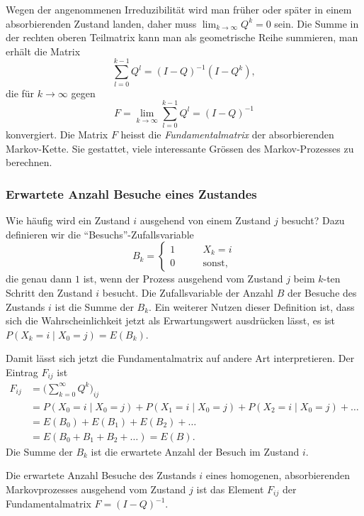 Wegen der angenommenen Irreduzibilität wird man
früher oder später in einem absorbierenden Zustand landen,
daher muss $\lim_{k\to\infty} Q^k=0$ sein.
Die Summe in der rechten oberen Teilmatrix kann man als geometrische
Reihe summieren, man erhält die Matrix
\[
\sum_{l=0}^{k-1} Q^l = (I-Q)^{-1}(I-Q^k),
\]
die für $k\to\infty$ gegen
\[
F
=
\lim_{k\to\infty} \sum_{l=0}^{k-1} Q^l
=
(I-Q)^{-1}
\]
konvergiert.
Die Matrix $F$ heisst die {\em Fundamentalmatrix} der absorbierenden
Markov-Kette.
%
Sie gestattet, viele interessante Grössen des Markov-Prozesses zu
berechnen.

\subsubsection{Erwartete Anzahl Besuche eines Zustandes}
Wie häufig wird ein Zustand $i$ ausgehend von einem Zustand $j$
besucht?
%
Dazu definieren wir die ``Besuchs''-Zufallsvariable
\[
B_{k}=\begin{cases}
1&\qquad\text{$X_k=i$}\\
0&\qquad\text{sonst,}
\end{cases}
\]
die genau dann $1$ ist, wenn der Prozess ausgehend vom Zustand $j$
beim $k$-ten Schritt den Zustand $i$ besucht.
Die Zufallsvariable der Anzahl $B$ der Besuche des Zustands $i$ ist die
Summe der $B_k$.
Ein weiterer Nutzen dieser Definition ist, dass sich die Wahrscheinlichkeit
jetzt als Erwartungswert ausdrücken lässt, es ist
$P(X_k=i \mid X_0=j) = E(B_k)$.

Damit lässt sich jetzt die Fundamentalmatrix auf andere Art interpretieren.
Der Eintrag $F_{i\!j}$ ist
\begin{align*}
F_{i\!j}
&=
\biggl(\sum_{k=0}^\infty Q^k\biggr)_{i\!j}
\\
&=
P(X_0=i\mid X_0=j)
+
P(X_1=i\mid X_0=j)
+
P(X_2=i\mid X_0=j)
+\dots
\\
&=E(B_0) + E(B_1) + E(B_2) + \dots
\\
&=E(B_0+B_1+B_2+\dots)
=E(B).
\end{align*}
Die Summe der $B_k$ ist die erwartete Anzahl der Besuch im Zustand $i$.

\begin{satz}
\label{buch:markov:satz:anzahlbesuche}
Die erwartete Anzahl Besuche des Zustands $i$ eines homogenen,
absorbierenden Markovprozesses ausgehend vom Zustand $j$ ist das
Element $F_{i\!j}$ der Fundamentalmatrix $F=(I-Q)^{-1}$.
\end{satz}

